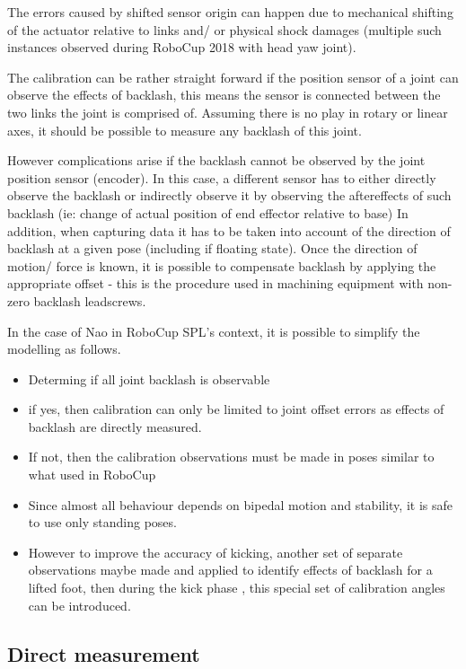 \documentclass[english, printversion, nomenclature, notitle]{tuvisionthesis} %
\begin{document}
The errors caused by shifted sensor origin can happen due to mechanical shifting of the actuator relative to links and/ or physical shock damages (multiple such instances observed during RoboCup 2018 with head yaw joint).

The calibration can be rather straight forward if the position sensor of a joint can observe the effects of backlash, this means the sensor is connected between the two links the joint is comprised of. Assuming there is no play in rotary or linear axes, it should be possible to measure any backlash of this joint.

However complications arise if the backlash cannot be observed by the joint position sensor (encoder). In this case, a different sensor has to either directly observe the backlash or indirectly observe it by observing the aftereffects of such backlash (ie: change of actual position of end effector relative to base)  In addition, when capturing data it has to be taken into account of the direction of backlash at a given pose (including if floating state). Once the direction of motion/ force is known, it is possible to compensate backlash by applying the appropriate offset - this is the procedure used in machining equipment with non-zero backlash leadscrews.

In the case of Nao in RoboCup SPL's context, it is possible to simplify the modelling as follows.
\begin{itemize}
	\item Determing if all joint backlash is observable
	\item if yes, then calibration can only be limited to joint offset errors as effects of backlash are directly measured.
	\item If not, then the calibration observations must be made in poses similar to what used in RoboCup
	\item Since almost all behaviour depends on bipedal motion and stability, it is safe to use only standing poses. 
	\item However to improve the accuracy of kicking, another set of separate observations maybe made and applied to identify effects of backlash for a lifted foot, then during the kick phase , this special set of calibration angles can be introduced.
\end{itemize}

\subsection{Direct measurement}
\end{document}
